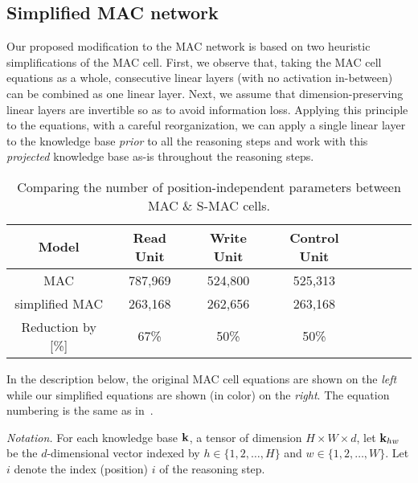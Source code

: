 \subsection{Simplified MAC network}
Our proposed modification to the MAC network is based on two heuristic
simplifications of the MAC cell. 
First, we observe that, taking the MAC cell equations as a whole, consecutive linear layers (with no activation in-between) can be combined as one linear layer.
Next, we assume that dimension-preserving linear layers are invertible
so as to avoid information loss. 
Applying this principle to the equations, with a careful reorganization,
we can apply a single linear layer to the knowledge base \emph{prior}
to all the reasoning steps and work with this \emph{projected} knowledge base
as-is throughout the reasoning steps.



\begin{table}[!t]
	\centering
	\begin{tabular}{ccccCcCc}
		\toprule
		Model        & Read Unit               & Write Unit &  Control Unit         \\
		\midrule
		MAC   &  787,969 &  524,800        &    525,313    \\
		simplified MAC & 263,168  & 262,656       &    263,168 \\
		\midrule
		Reduction by [\%]  & 67\%  &   50\%       &      50\%  \\
		\bottomrule
	\end{tabular}
	\caption{Comparing the number of position-independent parameters between MAC \& S-MAC cells.}
	\label{tab:parameters}
\end{table}



In the description below, the original MAC cell equations are shown on the \emph{left}
while our simplified equations are shown (in color) on the {\color{Plum} \emph{right}}.
The equation numbering is the same as in~\cite{hudson2018compositional}.

\noindent\textit{Notation.}
For each knowledge base $\mathbf{k}$, a tensor of dimension $H \times W \times d$, let $\mathbf{k}_{hw}$ be the $d$-dimensional vector indexed by 
$h \in \{1,2,\dots,H\}$ and $w \in \{1,2,\dots, W\}$.
Let $i$ denote the index (position) $i$ of the reasoning step. 

